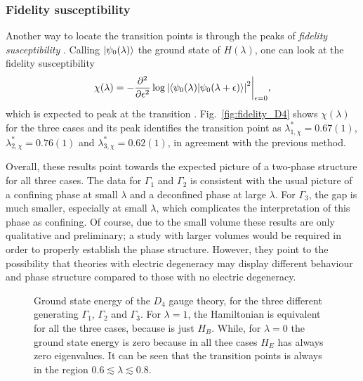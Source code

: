 \subsubsection*{Fidelity susceptibility}

Another way to locate the transition points is through the peaks of \emph{fidelity susceptibility} \cite{you2007fidelity, wang2016fidelity}.
Calling $\ket{\psi_0(\lambda)}$ the ground state of $H(\lambda)$, one can look at the fidelity susceptibility
\cite{you2007fidelity}
\begin{equation}
    \chi(\lambda) = -\frac{\partial^2}{\partial \epsilon^2} \log \abs{\expval{\psi_0(\lambda) | \psi_0(\lambda+\epsilon) }}^2 \bigg\lvert_{\epsilon=0},
\end{equation}
which is expected to peak at the transition \cite{wang2016fidelity}.
Fig.~\ref{fig:fidelity_D4} shows $\chi(\lambda)$ for the three cases and its peak identifies the transition point as $\lambda_{1, \chi}^*=0.67(1)$, $\lambda_{2, \chi}^*=0.76(1)$ and $\lambda_{3, \chi}^*=0.62(1)$, in agreement with the previous method.

\bigbreak

Overall, these results point towards the expected picture of a two-phase structure for all three cases.
The data for $\Gamma_1$ and $\Gamma_2$ is consistent with the usual picture of a confining phase at small $\lambda$ and a deconfined phase at large $\lambda$.
For $\Gamma_3$, the gap is much smaller, especially at small $\lambda$, which complicates the interpretation of this phase as confining.
Of course, due to the small volume these results are only qualitative and preliminary; a study with larger volumes would be required in order to properly establish the phase structure.
However, they point to the possibility that theories with electric degeneracy may display different behaviour and phase structure compared to those with no electric degeneracy.

\newpage

\vspace*{1cm}

\begin{figure}[h]
    \centering
    
    \caption[Ground state energy for $D_4$]{Ground state energy of the $D_4$ gauge theory, for the three different generating $\Gamma_1$, $\Gamma_2$ and $\Gamma_3$.
        For $\lambda=1$, the Hamiltonian is equivalent for all the three cases, because is just $H_B$.
        While, for $\lambda=0$ the ground state energy is zero because in all thee cases $H_E$ has always zero eigenvalues.
        It can be seen that the transition points is always in the region $ 0.6 \lesssim \lambda \lesssim 0.8$.
    }%
    \label{fig:ground_state_energy_D4}
\end{figure}

